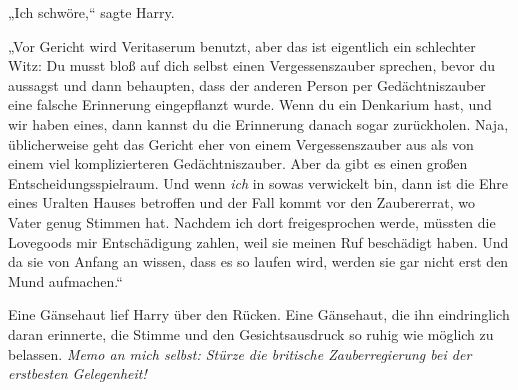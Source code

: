 




„Ich schwöre,“ sagte Harry.

„Vor Gericht wird Veritaserum benutzt, aber das ist eigentlich ein schlechter Witz: Du musst bloß auf dich selbst einen Vergessenszauber sprechen, bevor du aussagst und dann behaupten, dass der anderen Person per Gedächtniszauber eine falsche Erinnerung eingepflanzt wurde. Wenn du ein Denkarium hast, und wir haben eines, dann kannst du die Erinnerung danach sogar zurückholen. Naja, üblicherweise geht das Gericht eher von einem Vergessenszauber aus als von einem viel komplizierteren Gedächtniszauber. Aber da gibt es einen großen Entscheidungsspielraum. Und wenn \emph{ich} in sowas verwickelt bin, dann ist die Ehre eines Uralten Hauses betroffen und der Fall kommt vor den Zaubererrat, wo Vater genug Stimmen hat. Nachdem ich dort freigesprochen werde, müssten die Lovegoods mir Entschädigung zahlen, weil sie meinen Ruf beschädigt haben. Und da sie von Anfang an wissen, dass es so laufen wird, werden sie gar nicht erst den Mund aufmachen.“

Eine Gänsehaut lief Harry über den Rücken. Eine Gänsehaut, die ihn eindringlich daran erinnerte, die Stimme und den Gesichtsausdruck so ruhig wie möglich zu belassen. \emph{Memo an mich selbst: Stürze die britische Zauberregierung bei der erstbesten Gelegenheit!}


